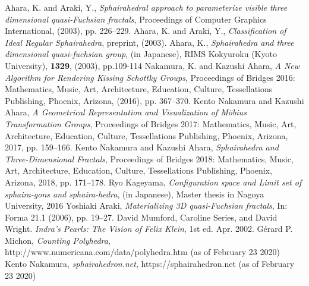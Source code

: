 \documentclass[suppldata, dvipdfmx]{interact}
\theoremstyle{plain}%
\theoremstyle{definition}
\theoremstyle{remark}
\theoremstyle{problemstyle}
\begin{document}
\begin{thebibliography}{99}
        Ahara, K. and Araki, Y.,
        \emph{Sphairahedral approach to parameterize visible three
        dimensional quasi-Fuchsian fractals},
        Proceedings of Computer Graphics International, (2003),
        pp. 226--229.
        Ahara, K. and Araki, Y.,
        \emph{Classification of Ideal Regular Sphairahedra},
        preprint, (2003).
        Ahara, K., \emph{Sphairahedra and three dimensional quasi-fuchsian group},
        (in Japanese), RIMS Kokyuroku (Kyoto University), {\bfseries 1329}, (2003), pp.109-114
        Nakamura, K. and Kazushi Ahara,
        \emph{A New Algorithm for Rendering Kissing Schottky Groups}, 
        Proceedings of Bridges 2016: Mathematics, Music, Art, Architecture,
        Education, Culture, Tessellations Publishing,
        Phoenix, Arizona, (2016), pp. 367--370.
        Kento Nakamura and Kazushi Ahara,
        \emph{A Geometrical Representation and Visualization of M\"{o}bius Transformation Groups}, 
        Proceedings of Bridges 2017: Mathematics, Music, Art, Architecture,
        Education, Culture, Tessellations Publishing,
        Phoenix, Arizona, 2017, pp. 159--166.
        Kento Nakamura and Kazushi Ahara,
        \emph{Sphairahedra and Three-Dimensional Fractals}, 
        Proceedings of Bridges 2018: Mathematics, Music, Art, Architecture,
        Education, Culture, Tessellations Publishing,
        Phoenix, Arizona, 2018, pp. 171--178.
        Ryo Kageyama,
        \emph{Configuration space and Limit set of sphaira-gons and sphaira-hedra},
        (in Japanese), Master thesis in Nagoya University, 2016
        Yoshiaki Araki,
        \emph{Materializing 3D quasi-Fuchsian fractals},
        In: Forma 21.1 (2006), pp. 19–27.
        David Mumford, Caroline Series, and David Wright.
        \emph{Indra’s Pearls: The Vision of Felix Klein},
        1st ed. Apr. 2002.
        G\'erard P. Michon, 
        \emph{Counting Polyhedra},\\
        http://www.numericana.com/data/polyhedra.htm
        (as of February 23 2020)
        Kento Nakamura, 
        \emph{sphairahedron.net},
        https://sphairahedron.net
        (as of February 23 2020)

\end{thebibliography}
\end{document}
